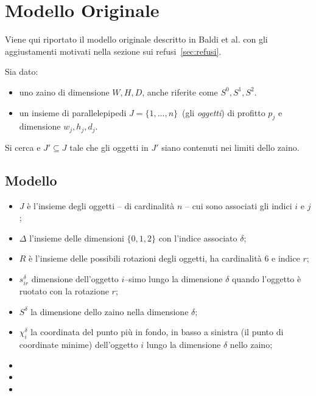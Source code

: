\section{Modello Originale}
\label{sec:modello:originale}

Viene qui riportato il modello originale descritto in Baldi et al. 
\cite{Baldi20129802}
con gli aggiustamenti motivati nella sezione sui refusi~\ref{sec:refusi}.




Sia dato:
\begin{itemize} 
	\item uno zaino di dimensione $W, H, D$, anche riferite come $S^0, S^1, S^2$.
	\item un insieme di parallelepipedi $J = \{1, \dots, n\}$\ (gli \emph{oggetti})
	di profitto $p_j$ e dimensione $w_j, h_j, d_j$.
\end{itemize}

Si cerca e $J' \subseteq J$ tale che gli oggetti in $J'$ siano contenuti nei 
limiti dello zaino.


\subsection{Modello}
\begin{itemize}
	\item $J$ è l'insieme degli oggetti -- di cardinalità $n$ -- cui sono 
	associati gli indici $i$ e $j$;
	\item $\Delta$ l'insieme delle dimensioni $\{0,1,2\}$ con l'indice associato
	$\delta$;
	\item $R$ è l'insieme delle possibili rotazioni degli oggetti, ha 
	cardinalità $6$ e indice $r$;
	\item $s_{ir}^\delta$ dimensione dell'oggetto $i$--simo lungo la dimensione
	$\delta$ quando l'oggetto è ruotato con la rotazione $r$;
	\item $S^\delta$ la dimensione dello zaino nella dimensione $\delta$;
	\item $\chi_{i}^\delta$ la coordinata del punto più in fondo, in basso a 
	sinistra (il punto di coordinate minime) dell'oggetto $i$ lungo la 
	dimensione $\delta$ nello zaino;
	\item 
	\item 
	\item {}
\end{itemize}


